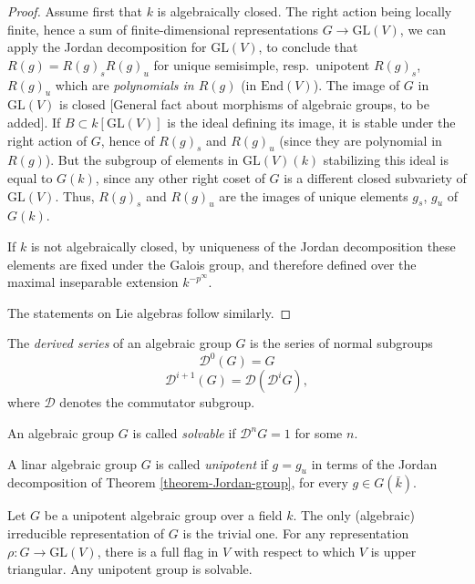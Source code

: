 \begin{proof}
 Assume first that $k$ is algebraically closed. The right action being locally finite, hence a sum of finite-dimensional representations $G\to \text{GL}(V)$, we can apply the Jordan decomposition for $\text{GL}(V)$, to conclude that $R(g) = R(g)_s R(g)_u$ for unique semisimple, resp.\ unipotent $R(g)_s$, $R(g)_u$ which are \emph{polynomials in $R(g)$} (in $\text{End}(V)$). The image of $G$ in $\text{GL}(V)$ is closed [General fact about morphisms of algebraic groups, to be added]. If $B\subset k[\text{GL}(V)]$ is the ideal defining its image, it is stable under the right action of $G$, hence of $R(g)_s$ and $R(g)_u$ (since they are polynomial in $R(g)$). But the subgroup of elements in $\text{GL}(V)(k)$ stabilizing this ideal is equal to $G(k)$, since any other right coset of $G$ is a different closed subvariety of $\text{GL}(V)$. Thus, $R(g)_s$ and $R(g)_u$ are the images of unique elements $g_s$, $g_u$ of $G(k)$.
 
 If $k$ is not algebraically closed, by uniqueness of the Jordan decomposition these elements are fixed under the Galois group, and therefore defined over the maximal inseparable extension $k^{-p^\infty}$.   
 
 The statements on Lie algebras follow similarly. 
\end{proof}


\begin{definition}
 \label{definition-solvable-unipotent}
The {\it derived series} of an algebraic group $G$ is the series of normal subgroups 
$$ \mathcal D^0(G) = G$$
$$ \mathcal D^{i+1}(G) = \mathcal D(\mathcal D^iG),$$
where $\mathcal D$ denotes the commutator subgroup. 

An algebraic group $G$ is called \emph{solvable} if $\mathcal D^n G=1$ for some $n$. 

A linar algebraic group $G$ is called \emph{unipotent} if $g = g_u$ in terms of the Jordan decomposition of Theorem \ref{theorem-Jordan-group}, for every $g\in G(\bar k)$.
\end{definition}

\begin{theorem}
\label{theorem-representations-unipotent}
Let $G$ be a unipotent algebraic group over a field $k$. The only (algebraic) irreducible representation of $G$ is the trivial one. For any representation $\rho:G \to \text{GL}(V)$, there is a full flag in $V$ with respect to which $V$ is upper triangular. Any unipotent group is solvable.
\end{theorem}

